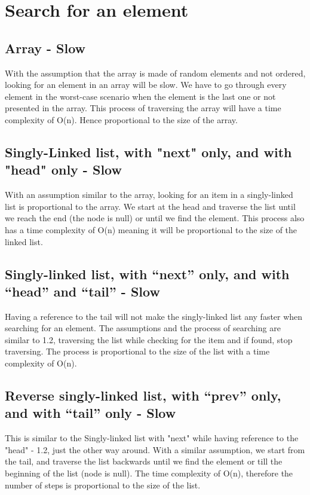 \documentclass{article}
\begin{document}
\section{Search for an element}
\subsection{Array - Slow}
With the assumption that the array is made of random elements and not ordered, looking for an element in an array will be slow. We have to go through every element in the worst-case scenario when the element is the last one or not presented in the array. This process of traversing the array will have a time complexity of O(n). Hence proportional to the size of the array.

\subsection{Singly-Linked list, with "next" only, and with "head" only - Slow}
With an assumption similar to the array, looking for an item in a singly-linked list is proportional to the array. We start at the head and traverse the list until we reach the end (the node is null) or until we find the element. This process also has a time complexity of O(n) meaning it will be proportional to the size of the linked list.

\subsection{Singly-linked list, with “next” only, and with “head” and “tail” - Slow}
Having a reference to the tail will not make the singly-linked list any faster when searching for an element. The assumptions and the process of searching are similar to 1.2, traversing the list while checking for the item and if found, stop traversing. The process is proportional to the size of the list with a time complexity of O(n).

\subsection{Reverse singly-linked list, with “prev” only, and with “tail” only - Slow}
This is similar to the Singly-linked list with "next" while having reference to the "head" - 1.2, just the other way around. With a similar assumption, we start from the tail, and traverse the list backwards until we find the element or till the beginning of the list (node is null). The time complexity of O(n), therefore the number of steps is proportional to the size of the list.
\end{document}
